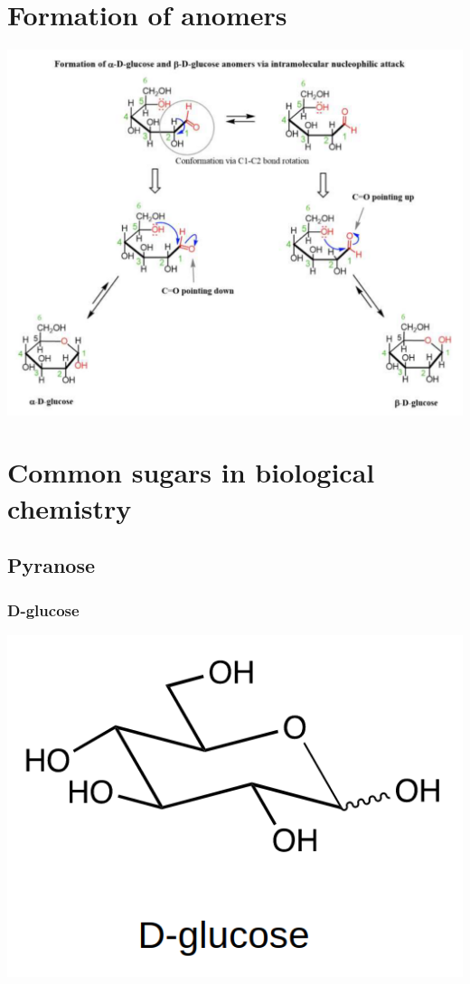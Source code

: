 \documentclass[11pt]{article}
\begin{document}
\section{Formation of anomers}
\label{sec:orge15aaec}
\begin{center}
\includegraphics[width=.9\linewidth]{./images/formation-of-anomers.png}
\end{center}
\section{Common sugars in biological chemistry}
\label{sec:org38fafef}

\subsection{Pyranose}
\label{sec:org2dc965c}

\subsubsection{D-glucose}
\label{sec:org5de9774}

\begin{center}
\includegraphics[scale=1.0]{./images/d-glucose.png}
\end{center}
\end{document}

